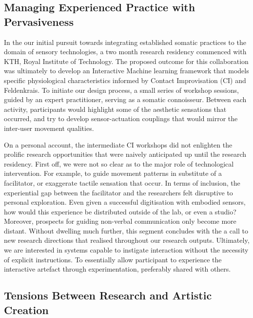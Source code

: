 \subsection{Managing Experienced Practice with Pervasiveness}

In the our initial pursuit towards integrating established somatic practices to the domain of sensory technologies, a two month research residency commenced with KTH, Royal Institute of Technology. The proposed outcome for this collaboration was ultimately to develop an Interactive Machine learning framework that models specific physiological characteristics informed by Contact Improvisation (CI) and Feldenkrais. To initiate our design process, a small series of workshop sessions, guided by an expert practitioner, serving as a somatic connoisseur. Between each activity, participants would highlight some of the aesthetic sensations that occurred, and try to develop sensor-actuation couplings that would mirror the inter-user movement qualities.

On a personal account, the intermediate CI workshops did not enlighten the prolific research opportunities that were naively anticipated up until the research residency. First off, we were not so clear as to the major role of technological intervention. For example, to guide movement patterns in substitute of a facilitator, or exaggerate tactile sensation that occur. In terms of inclusion, the experiential gap between the facilitator and the researchers felt disruptive to personal exploration. Even given a successful digitisation with embodied sensors, how would this experience be distributed outside of the lab, or even a studio? Moreover, prospects for guiding non-verbal communication only become more distant. Without dwelling much further, this segment concludes with the a call to new research directions that realised throughout our research outputs. Ultimately, we are interested in systems capable to instigate interaction without the necessity of explicit instructions. To essentially allow participant to experience the interactive artefact through experimentation, preferably shared with others.

\subsection{Tensions Between Research and Artistic Creation}

